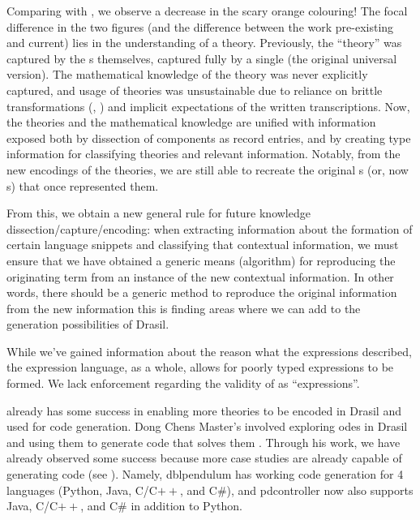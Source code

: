 \theoriesWithModelKinds{}

Comparing  with , we
observe a decrease in the scary orange colouring! The focal difference in the
two figures (and the difference between the work pre-existing and current) lies
in the understanding of a theory. Previously, the ``theory'' was captured by the
\RelationConcept{}s themselves, captured fully by a single \Expr{} (the original
universal version). The mathematical knowledge of the theory was never
explicitly captured, and usage of theories was unsustainable due to reliance on
brittle transformations (\relToQD{}, ) and implicit
expectations of the written transcriptions. Now, the theories and the
mathematical knowledge are unified with information exposed both by dissection
of components as record entries, and by creating type information for
classifying theories and relevant information. Notably, from the new encodings
of the theories, we are still able to recreate the original \Expr{}s (or, now
\ModelExpr{}s) that once represented them.



From this, we obtain a new general rule for future knowledge
dissection/capture/encoding: when extracting information about the formation of
certain language snippets and classifying that contextual information, we must
ensure that we have obtained a generic means (algorithm) for reproducing the
originating term from an instance of the new contextual information. In other
words, there should be a generic method to reproduce the original information
from the new information \textemdash{} this is finding areas where we can add to the
generation possibilities of Drasil.

While we've gained information about the reason what the expressions described,
the expression language, as a whole, allows for poorly typed expressions to be
formed. We lack enforcement regarding the validity of \Expr{} as
``expressions''.

\ModelKind{} already has some success in enabling more theories to be encoded in
Drasil and used for code generation. Dong Chens Master's involved exploring
\acsp{ode} in Drasil and using them to generate code that solves them
\cite{Chen2022MEng}. Through his work, we have already observed some success
because more case studies are already capable of generating code (see
). Namely, \acs{dblpendulum} has working
code generation for 4 languages (Python, Java, C/C\(++\), and C\#), and
\acs{pdcontroller} now also supports Java, C/C\(++\), and C\# in addition to
Python.

\caseStudiesCodeTableAfterDongsWork{}
